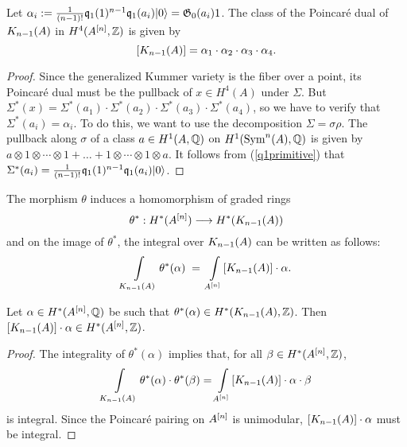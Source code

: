 \begin{proposition}
Let $\alpha_i := \frac{1}{(n-1)!}\kq_{1}(1)^{n-1}\kq_1(a_i)\vac = \G_0(a_i)1$. The class of the Poincar\'e dual of $\kum{A}{n-1}$ in $H^4(A\hilb{n},\Z)$ is given by
$$
[\kum{A}{n-1}]=\alpha_1\cdot\alpha_2\cdot\alpha_3\cdot\alpha_4.
$$ 
\end{proposition}
\begin{proof}
Since the generalized Kummer variety is the fiber over a point, its Poincar\'e dual must be the pullback of $x\in H^4(A)$ under $\Sigma$. But $\Sigma^* (x) = \Sigma^*(a_1)\cdot \Sigma^*(a_2)\cdot \Sigma^*(a_3)\cdot \Sigma^*(a_4)$, so we have to verify that $\Sigma^* (a_i) = \alpha_i$. To do this, we want to use the decomposition $\Sigma = \sigma\rho$.
The pullback along $\sigma$ of a class $a\in H^1(A,\Q)$ on $H^1(\Sym^n(A),\Q)$ 
is given by $a\otimes 1\otimes \cdots\otimes 1 + \ldots + 1\otimes \cdots\otimes 1\otimes a$. It follows from (\ref{q1primitive}) that $\Sigma^* (a_i) = \frac{1}{(n-1)!}\kq_{1}(1)^{n-1}\kq_1(a_i)\vac $.
\end{proof}
The morphism $\theta$ induces a homomorphism of graded rings
\begin{equation}
\theta^* :H^*(A\hilb{n})\longrightarrow H^*(\kum{A}{n-1})
\end{equation}
and on the image of $\theta^*$, the integral over $\kum{A}{n-1}$ can be written as follows:
\begin{equation}
\int\limits_{\kum{A}{n-1}}\theta^*(\alpha)\; =\; \int\limits_{A\hilb{n}} [\kum{A}{n-1}]\cdot\alpha .
\end{equation}
\begin{lemma}\label{IntegralityCheck}
Let $\alpha\in H^*(A\hilb{n},\Q)$ be such that $\theta^*(\alpha)\in  H^*(\kum{A}{n-1},\Z)$. Then $[\kum{A}{n-1}]\cdot\alpha \in H^*(A\hilb{n},\Z)$. 
\end{lemma}
\begin{proof}
The integrality of $\theta^*(\alpha)$ implies that, for all $\beta \in H^*(A\hilb{n},\Z)$,
$$
\int\limits_{\kum{A}{n-1}} \theta^*(\alpha)\cdot\theta^*(\beta) = \int\limits_{A\hilb{n}} [\kum{A}{n-1}]\cdot\alpha\cdot\beta
$$
is integral. Since the Poincar\'e pairing on $A\hilb{n}$ is unimodular, $[\kum{A}{n-1}]\cdot\alpha$ must be integral.
\end{proof}

